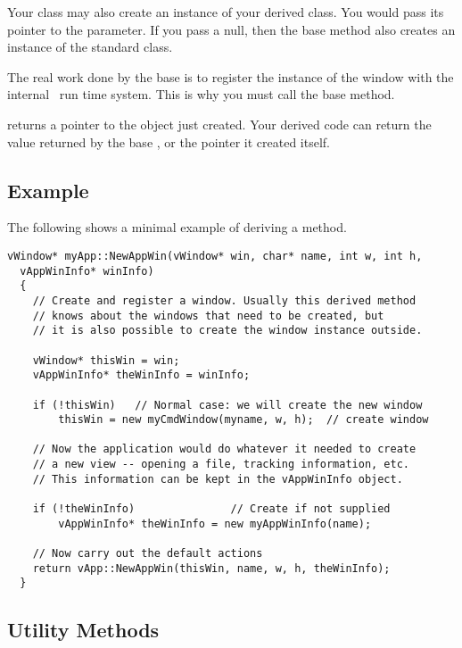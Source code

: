 Your  class may also create an instance of your
derived  class. You would pass its pointer to the
 parameter. If you pass a null, then the base 
method also  creates an instance of the standard 
class.

The real work done by the base  is to register
the instance of the window with the internal \V\ run time system.
This is why you must call the base  method.

 returns a pointer to the object just created. Your
derived code can return the value returned by the base
, or the pointer it created itself.

\subsection* {Example}

The following shows a minimal example of deriving a 
method.

\footnotesize

\begin{verbatim}
vWindow* myApp::NewAppWin(vWindow* win, char* name, int w, int h,
  vAppWinInfo* winInfo)
  {
    // Create and register a window. Usually this derived method
    // knows about the windows that need to be created, but
    // it is also possible to create the window instance outside.

    vWindow* thisWin = win;
    vAppWinInfo* theWinInfo = winInfo;

    if (!thisWin)   // Normal case: we will create the new window
        thisWin = new myCmdWindow(myname, w, h);  // create window

    // Now the application would do whatever it needed to create
    // a new view -- opening a file, tracking information, etc.
    // This information can be kept in the vAppWinInfo object.

    if (!theWinInfo)               // Create if not supplied
        vAppWinInfo* theWinInfo = new myAppWinInfo(name);

    // Now carry out the default actions
    return vApp::NewAppWin(thisWin, name, w, h, theWinInfo);
  }
\end{verbatim}
\normalfont\normalsize

\subsection* {Utility Methods} %

